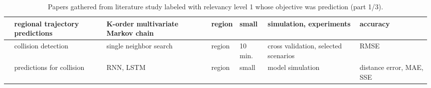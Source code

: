 \begin{table}[htbp]
{\begin{tabularx}{1.2\textwidth}{p{0.6in} X X p{0.5in} p{0.4in} X p{0.5in}}
    \cite{Guo2018TrajectoryChain} & regional trajectory predictions & K-order multivariate Markov chain & region & small & simulation, experiments & accuracy \\ \midrule
    \cite{Hexeberg2017AIS-basedPrediction} & collision detection & single neighbor search & region & 10 min. & cross validation, selected scenarios & RMSE \\
    \midrule
    \cite{Jin2020MaritimeNetwork} & predictions for collision & RNN, LSTM & region & small & model simulation & distance error, MAE, SSE \\ \midrule
\end{tabularx}}
\caption{Papers gathered from literature study labeled with relevancy level 1 whose objective was prediction (part 1/3).}
\label{tab:lit_review_cat_1_1}
\end{table}

